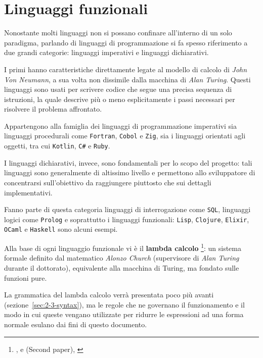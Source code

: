 \section{Linguaggi funzionali}
\label{sec:2-1-functional-languages}

Nonostante molti linguaggi non si possano confinare all'interno di un solo paradigma,
parlando di linguaggi di programmazione si fa spesso riferimento a due grandi categorie:
linguaggi imperativi e linguaggi dichiarativi.


I primi hanno caratteristiche direttamente legate al modello di calcolo di \textit{John Von Neumann},
a sua volta non dissimile dalla macchina di \textit{Alan Turing}.
Questi linguaggi sono usati per scrivere codice che segue una precisa sequenza di istruzioni,
la quale descrive più o meno esplicitamente i passi necessari per risolvere il problema affrontato.

\noindent Appartengono alla famiglia dei linguaggi di programmazione imperativi sia linguaggi procedurali come
\texttt{Fortran}, \texttt{Cobol} e \texttt{Zig}, sia i linguaggi orientati agli oggetti, tra cui \texttt{Kotlin}, \texttt{C\#} e \texttt{Ruby}.


I linguaggi dichiarativi, invece, sono fondamentali per lo scopo del progetto:
tali linguaggi sono generalmente di altissimo livello e permettono allo sviluppatore
di concentrarsi sull'obiettivo da raggiungere piuttosto che sui dettagli implementativi.

\noindent Fanno parte di questa categoria linguaggi di interrogazione come \texttt{SQL},
linguaggi logici come \texttt{Prolog} e soprattutto i linguaggi funzionali:
\texttt{Lisp}, \texttt{Clojure}, \texttt{Elixir}, \texttt{OCaml} e \texttt{Haskell} sono alcuni esempi.


Alla base di ogni linguaggio funzionale vi è il \textbf{lambda calcolo}%
\footnote{, \cite{Church-1932-FoundationLogic}
      e  (Second paper), \cite{Church-1933-FoundationLogic}}:
un sistema formale definito dal matematico \textit{Alonzo Church} (supervisore di \textit{Alan Turing} durante il dottorato),
equivalente alla macchina di Turing, ma fondato sulle funzioni pure.

\newpage

\noindent La grammatica del lambda calcolo verrà presentata poco più avanti (sezione~\ref{sec:2-3-syntax}),
ma le regole che ne governano il funzionamento e il modo in cui queste vengano utilizzate per ridurre
le espressioni ad una forma normale esulano dai fini di questo documento.

